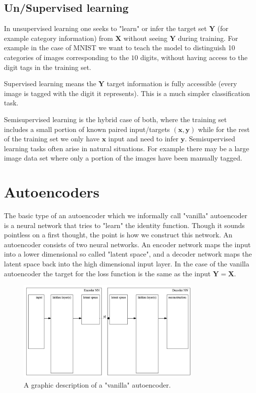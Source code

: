 \documentclass[11pt, a4paper]{report}
\theoremstyle{plain}
\theoremstyle{definition}
\theoremstyle{remark}
\newcommand{\X}{\mathbf{X}}
\newcommand{\x}{\mathbf{x}}
\newcommand{\Y}{\mathbf{Y}}
\newcommand{\y}{\mathbf{y}}
\begin{document}
\subsection{Un/Supervised learning}

In unsupervised learning one seeks to "learn" or infer the target set $\Y$ (for example
category information) from $\X$ without seeing $\Y$ during training.
For example in the case of MNIST we want to teach the model to distinguish
10 categories of images corresponding to the $10$ digits, without having access
to the digit tags in the training set.

Supervised learning means the $\Y$ target information is fully accessible (every image
is tagged with the digit it represents). This is a much simpler classification
task.

Semisupervised learning is the hybrid case of both, where the training set
includes a small portion of known paired input/targets $(\x,\y)$ while for the
rest of the training set we only have $\x$ input and need to infer $\y$.
Semisupervised learning tasks often arise in natural situations. For example
there may be a large image data set where only a portion of the images have been
manually tagged.

\section{Autoencoders}

The basic type of an autoencoder which we informally call "vanilla" autoencoder
is a neural network that tries to "learn" the identity function. Though it sounds
pointless on a first thought, the point is how we construct this network. An
autoencoder consists of two neural networks.
An encoder network maps the input into a lower dimensional so called "latent
space", and a decoder network maps the latent space back into the high
dimensional input layer.
In the case of the vanilla autoencoder the target for the loss function is the
same as the input $\Y = \X$.

\begin{figure}[!h]
\begin{framed}
\centering
\includegraphics[width=0.8\textwidth]{./plots/autoencoderNN.gv.png}
\caption{
A graphic description of a "vanilla" autoencoder.
}
\label{fig:autoencoder}
\end{framed}
\end{figure}
\end{document}
